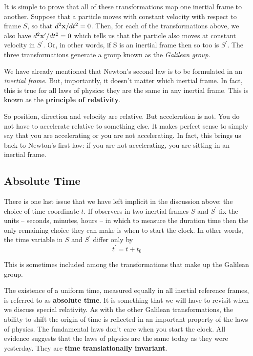 It is simple to prove that all of these transformations map one inertial frame to another. Suppose that a particle moves with constant velocity with respect to frame $S$, so that $d^2\vb{x}/dt^2=0$. Then, for each of the transformations above, we also have $d^2\vb{x}^\prime/dt^2=0$ which tells us that the particle also moves at constant velocity in $S^\prime$. Or, in other words, if S is an inertial frame then so too is $S^\prime$. The three transformations generate a group known as the \emph{Galilean group}.

We have already mentioned that Newton's second law is to be formulated in an \textit{inertial frame}. But, importantly, it doesn't matter which inertial frame. In fact, this is true for all laws of physics: they are the same in any inertial frame. This is known as the \textbf{principle of relativity}.

So position, direction and velocity are relative. But acceleration is not. You do not have to accelerate relative to something else. It makes perfect sense to simply say that you are accelerating or you are not accelerating. In fact, this brings us back to Newton's first law: if you are not accelerating, you are sitting in an inertial frame.

\subsection{Absolute Time}
There is one last issue that we have left implicit in the discussion above: the choice of time coordinate $t$. If observers in two inertial frames $S$ and $S^\prime$ fix the units -- seconds, minutes, hours -- in which to measure the duration time then the only remaining choice they can make is when to start the clock. In other words, the time variable in $S$ and $S^\prime$ differ only by
\[ t^\prime = t + t_0 \]

This is sometimes included among the transformations that make up the Galilean group.

The existence of a uniform time, measured equally in all inertial reference frames, is referred to as \textbf{absolute time}. It is something that we will have to revisit when we discuss special relativity. As with the other Galilean transformations, the ability to shift the origin of time is reflected in an important property of the laws of physics. The fundamental laws don't care when you start the clock. All evidence suggests that the laws of physics are the same today as they were yesterday. They are \textbf{time translationally invariant}.

